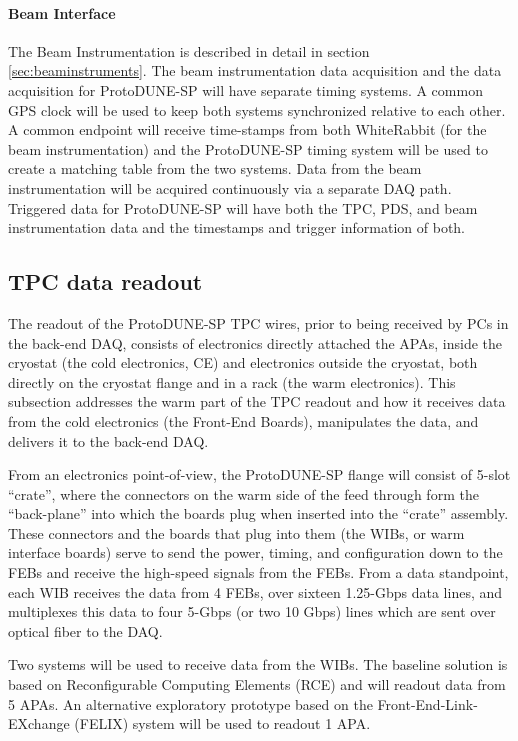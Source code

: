 \paragraph{Beam Interface}

The Beam Instrumentation is described in detail in section \ref{sec:beaminstruments}.
The beam instrumentation data acquisition and the data acquisition for ProtoDUNE-SP
will have separate timing systems.  A common GPS clock will be used to keep both
systems synchronized relative to each other.  A common endpoint will receive time-stamps 
from both WhiteRabbit (for the beam instrumentation) and the ProtoDUNE-SP timing system
will be used to create a matching table from the two systems.  Data from the beam
instrumentation will be acquired continuously via a separate DAQ path.  Triggered
data for ProtoDUNE-SP will have both the TPC, PDS, and beam instrumentation data and 
the timestamps and trigger information of both.

\subsection{TPC data readout}

The readout of the ProtoDUNE-SP TPC wires, prior to being received by PCs in
the back-end DAQ, consists of  electronics directly attached the APAs,
inside the cryostat (the cold electronics, CE) and  electronics outside
the cryostat, both directly on the cryostat flange and in a rack (the
warm electronics).  This subsection
addresses the warm part of the TPC
readout and how it receives data from the cold electronics (the Front-End
Boards), manipulates the data, and delivers it to the back-end DAQ.

From an electronics point-of-view, the ProtoDUNE-SP flange will consist of
5-slot ``crate'', where the connectors on the warm side of the feed
through form the ``back-plane'' into which the boards plug when inserted
into the ``crate'' assembly.  These connectors and the boards that plug
into them (the WIBs, or warm interface boards) serve to send the power,
timing, and configuration down to the FEBs and receive the high-speed
signals from the FEBs. From a data standpoint, each WIB receives the
data from 4 FEBs, over sixteen 1.25-Gbps data lines, and multiplexes
this data to four 5-Gbps (or two 10 Gbps) lines which are sent over
optical fiber to the DAQ.

Two systems will be used to receive data from the WIBs.  The baseline
solution is based on Reconfigurable Computing Elements (RCE) and will
readout data from 5 APAs.  An alternative exploratory prototype based on
the Front-End-Link-EXchange (FELIX) system will be used to readout 1 APA.

